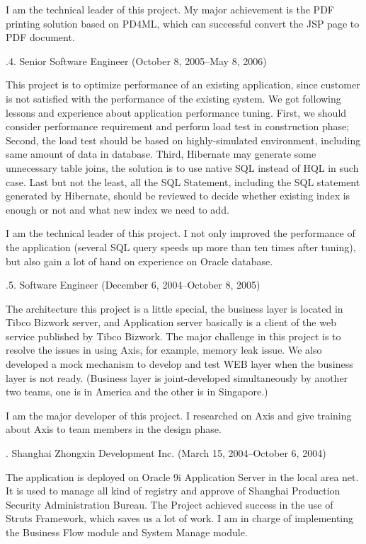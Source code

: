I am the technical leader of this project. My major achievement is the PDF printing solution based on PD4ML, which can successful convert the JSP page to PDF document. 

\smallskip\noindent
{}.4. Senior Software Engineer (October 8, 2005--May 8, 2006)\par
\noindent
This project is to optimize performance of an existing application, since customer is not satisfied with the performance of the existing system. We got following lessons and experience about application performance tuning. First, we should consider performance requirement and perform load test in construction phase; Second, the load test should be based on highly-simulated environment, including same amount of data  in database. Third, Hibernate may generate some unnecessary table joins, the solution is to use native SQL instead of HQL in such case. Last but not the least, all the SQL Statement, including the SQL statement generated by Hibernate, should be reviewed to decide whether existing index is enough or not and what new index we need to add. 

I am the technical leader of this project. I not only improved the performance of the application (several SQL query speeds up more than ten times after tuning), but also gain a lot of hand on experience on Oracle database.

\smallskip\noindent
{}.5. Software Engineer (December 6, 2004--October 8, 2005)\par
\noindent
The architecture this project is a little special, the business layer is located in Tibco Bizwork server, and Application server  basically is a client of the web service published by Tibco Bizwork. The major challenge in this project is to resolve the issues in using Axis, for example, memory leak issue. We also developed a mock mechanism to develop and test WEB layer when the business layer is not ready. (Business layer is joint-developed simultaneously by another two teams, one is in America and the other is in Singapore.)

I am the major developer of this project. I researched on Axis and give training about Axis to team members in the design phase. 

. Shanghai Zhongxin Development Inc. (March 15, 2004--October 6, 2004)\par

\noindent
The application is deployed on Oracle 9i Application Server in the local area net. It is used to manage all kind of  registry and approve of Shanghai Production Security Administration Bureau. The Project achieved success in the use of Struts Framework, which saves us a lot of work. I am in charge of implementing the Business Flow module and System Manage module. 

